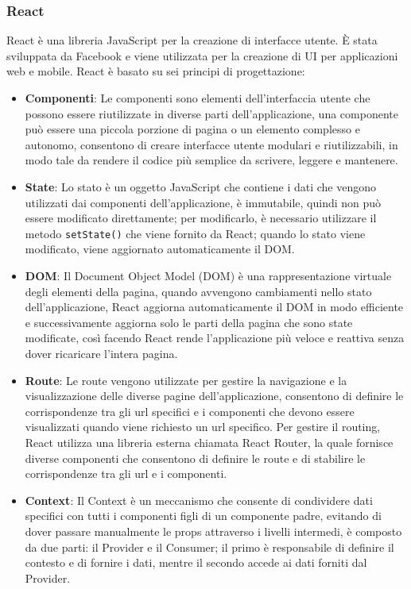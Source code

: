 \subsubsection{React}
React è una libreria JavaScript per la creazione di interfacce utente. È stata sviluppata da Facebook e viene utilizzata per la creazione di UI per applicazioni web e mobile. React è basato su sei principi di progettazione:
\begin{itemize}
\item \textbf{Componenti}: Le componenti sono elementi dell'interfaccia utente che possono essere riutilizzate in diverse parti dell'applicazione, una componente può essere una piccola porzione di pagina o un elemento complesso e autonomo, consentono di creare interfacce utente modulari e riutilizzabili, in modo tale da rendere il codice più semplice da scrivere, leggere e mantenere.\\
\item \textbf{State}: Lo stato è un oggetto JavaScript che contiene i dati che vengono utilizzati dai componenti dell'applicazione, è immutabile, quindi non può essere modificato direttamente; per modificarlo, è necessario utilizzare il metodo \texttt{setState()} che viene fornito da React; quando lo stato viene modificato, viene aggiornato automaticamente il DOM.\\
\item \textbf{DOM}:
Il Document Object Model (DOM) è una rappresentazione virtuale degli elementi della pagina, quando avvengono cambiamenti nello stato dell'applicazione, React aggiorna automaticamente il DOM in modo efficiente e successivamente aggiorna solo le parti della pagina che sono state modificate, così facendo React rende l'applicazione più veloce e reattiva senza dover ricaricare l'intera pagina.\\
\item \textbf{Route}:
Le route vengono utilizzate per gestire la navigazione e la visualizzazione delle diverse pagine dell'applicazione, consentono di definire le corrispondenze tra gli url specifici e i componenti che devono essere visualizzati quando viene richiesto un url specifico.
Per gestire il routing, React utilizza una libreria esterna chiamata React Router, la quale fornisce diverse componenti che consentono di definire le route e di stabilire le corrispondenze tra gli url e i componenti.\\
\item \textbf{Context}:
Il Context è un meccanismo che consente di condividere dati specifici con tutti i componenti figli di un componente padre, evitando di dover passare manualmente le props attraverso i livelli intermedi, è composto da due parti: il Provider e il Consumer; il primo è responsabile di definire il contesto e di fornire i dati, mentre il secondo accede ai dati forniti dal Provider.\\

\end{itemize}
